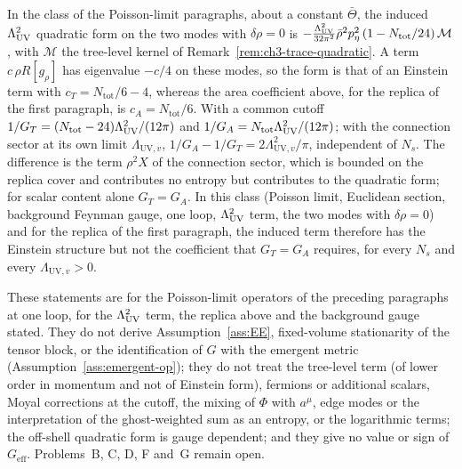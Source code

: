 In the class of the Poisson-limit paragraphs, about a constant \(\bar\Theta\), the induced \(\Lambda_{\mathrm{UV}}^2\) quadratic form on the two modes with \(\delta\rho=0\) is \(-\tfrac{\Lambda_{\mathrm{UV}}^2}{32\pi^2}\bar\rho^{2}p_\eta^2\,(1-N_{\mathrm{tot}}/24)\,\mathcal M\), with \(\mathcal M\) the tree-level kernel of Remark~\ref{rem:ch3-trace-quadratic}. A term \(c\,\rho R[g_\rho]\) has eigenvalue \(-c/4\) on these modes, so the form is that of an Einstein term with \(c_T=N_{\mathrm{tot}}/6-4\), whereas the area coefficient above, for the replica of the first paragraph, is \(c_A=N_{\mathrm{tot}}/6\). With a common cutoff \(1/G_T=(N_{\mathrm{tot}}-24)\Lambda_{\mathrm{UV}}^2/(12\pi)\) and \(1/G_A=N_{\mathrm{tot}}\Lambda_{\mathrm{UV}}^2/(12\pi)\); with the connection sector at its own limit \(\Lambda_{\mathrm{UV},v}\), \(1/G_A-1/G_T=2\Lambda_{\mathrm{UV},v}^2/\pi\), independent of \(N_s\). The difference is the term \(\rho^2X\) of the connection sector, which is bounded on the replica cover and contributes no entropy but contributes to the quadratic form; for scalar content alone \(G_T=G_A\). In this class (Poisson limit, Euclidean section, background Feynman gauge, one loop, \(\Lambda_{\mathrm{UV}}^2\) term, the two modes with \(\delta\rho=0\)) and for the replica of the first paragraph, the induced term therefore has the Einstein structure but not the coefficient that \(G_T=G_A\) requires, for every \(N_s\) and every \(\Lambda_{\mathrm{UV},v}>0\).

These statements are for the Poisson-limit operators of the preceding paragraphs at one loop, for the \(\Lambda_{\mathrm{UV}}^2\) term, the replica above and the background gauge stated. They do not derive Assumption~\ref{ass:EE}, fixed-volume stationarity of the tensor block, or the identification of \(G\) with the emergent metric (Assumption~\ref{ass:emergent-op}); they do not treat the tree-level term (of lower order in momentum and not of Einstein form), fermions or additional scalars, Moyal corrections at the cutoff, the mixing of \(\Phi\) with \(a^\mu\), edge modes or the interpretation of the ghost-weighted sum as an entropy, or the logarithmic terms; the off-shell quadratic form is gauge dependent; and they give no value or sign of \(G_{\mathrm{eff}}\). Problems~B, C, D, F and~G remain open.

